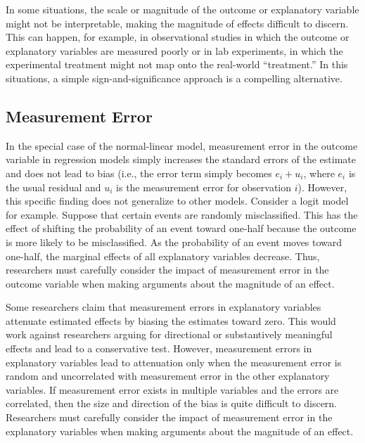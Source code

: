 \documentclass[12pt]{article}
\begin{document}
In some situations, the scale or magnitude of the outcome or explanatory variable might not be interpretable, making the magnitude of effects difficult to discern. This can happen, for example, in observational studies in which the outcome or explanatory variables are measured poorly or in lab experiments, in which the experimental treatment might not map onto the real-world ``treatment.'' In this situations, a simple sign-and-significance approach is a compelling alternative.

\subsection*{Measurement Error}


In the special case of the normal-linear model, measurement error in the outcome variable in regression models simply increases the standard errors of the estimate and does not lead to bias (i.e., the error term simply becomes $e_i + u_i$, where $e_i$ is the usual residual and $u_i$ is the measurement error for observation $i$). However, this specific finding does not generalize to other models. Consider a logit model for example. Suppose that certain events are randomly misclassified. This has the effect of shifting the probability of an event toward one-half because the outcome is more likely to be misclassified. As the probability of an event moves toward one-half, the marginal effects of all explanatory variables decrease. Thus, researchers must carefully consider the impact of measurement error in the outcome variable when making arguments about the magnitude of an effect.  


Some researchers claim that measurement errors in explanatory variables attenuate estimated effects by biasing the estimates toward zero. This would work against researchers arguing for directional or substantively meaningful effects and lead to a conservative test. However, measurement errors in explanatory variables lead to attenuation only when the measurement error is random and uncorrelated with measurement error in the other explanatory variables. If measurement error exists in multiple variables and the errors are correlated, then the size and direction of the bias is quite difficult to discern. Researchers must carefully consider the impact of measurement error in the explanatory variables when making arguments about the magnitude of an effect.
\end{document}
